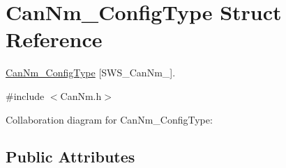\hypertarget{structCanNm__ConfigType}{}\section{Can\+Nm\+\_\+\+Config\+Type Struct Reference}
\label{structCanNm__ConfigType}


\hyperlink{structCanNm__ConfigType}{Can\+Nm\+\_\+\+Config\+Type} \mbox{[}S\+W\+S\+\_\+\+Can\+Nm\+\_\mbox{]}.  




{\ttfamily \#include $<$Can\+Nm.\+h$>$}



Collaboration diagram for Can\+Nm\+\_\+\+Config\+Type\+:
\subsection*{Public Attributes}
